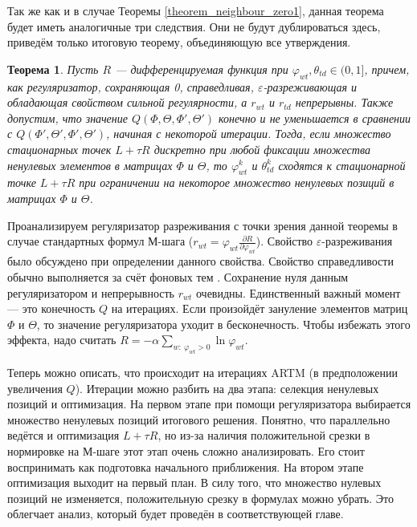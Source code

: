 \documentclass[12pt]{article}
\newtheorem{theorem}{Теорема}
\renewcommand{\phi}{\varphi}
\begin{document}
Так же как и в случае Теоремы \ref{theorem_neighbour_zero1}, данная теорема будет иметь аналогичные три следствия. Они не будут дублироваться здесь, приведём только итоговую теорему, объединяющую все утверждения.
\begin{theorem} \label{theorem_convergence1} Пусть $R$ --- дифференцируемая функция при $\phi_{wt}, \theta_{td} \in (0, 1]$, причем, как регуляризатор, сохраняющая 0, справедливая, $\varepsilon$-разреживающая и обладающая свойством сильной регулярности, а  $r_{wt}$ и $r_{td}$ непрерывны. Также допустим,  что значение $Q(\Phi, \Theta, \Phi', \Theta')$ конечно и не уменьшается в сравнении с $Q(\Phi', \Theta', \Phi', \Theta')$, начиная с некоторой итерации. Тогда, если множество стационарных точек $L + \tau R$ дискретно при любой фиксации множества ненулевых элементов в матрицах $\Phi$ и $\Theta$, то $\phi_{wt}^{k}$ и $\theta_{td}^{k}$ сходятся к стационарной точке $L + \tau R$ при ограничении на некоторое множество ненулевых позиций в матрицах $\Phi$ и $\Theta$.
\end{theorem}

Проанализируем регуляризатор разреживания с точки зрения данной теоремы в случае стандартных формул М-шага ($r_{wt} = \phi_{wt}\frac{\partial{R}}{\partial{\phi_{wt}}}$). Свойство $\varepsilon$-разреживания было обсуждено при определении данного свойства. Свойство справедливости обычно выполняется за счёт фоновых тем \cite{vorontsov2014tutorial} . Сохранение нуля данным регуляризатором и непрерывность $r_{wt}$ очевидны. Единственный важный момент --- это конечность $Q$ на итерациях. Если произойдёт зануление элементов матриц $\Phi$ и $\Theta$, то значение регуляризатора уходит в бесконечность. Чтобы избежать этого эффекта, надо считать $R = -\alpha \sum\limits_{w\colon~\phi_{wt} > 0} \ln\phi_{wt}$.

Теперь можно описать, что происходит на итерациях ARTM (в предположении увеличения $Q$). Итерации можно разбить на два этапа: селекция ненулевых позиций и оптимизация. На первом этапе при помощи регуляризатора выбирается множество ненулевых позиций итогового решения. Понятно, что параллельно ведётся и оптимизация $L + \tau R$, но из-за наличия положительной срезки в нормировке на М-шаге этот этап очень сложно анализировать. Его стоит воспринимать как подготовка начального приближения. На втором этапе оптимизация выходит на первый план. В силу того, что множество нулевых позиций не изменяется, положительную срезку в формулах можно убрать. Это облегчает анализ, который будет проведён в соответствующей главе.
\end{document}
